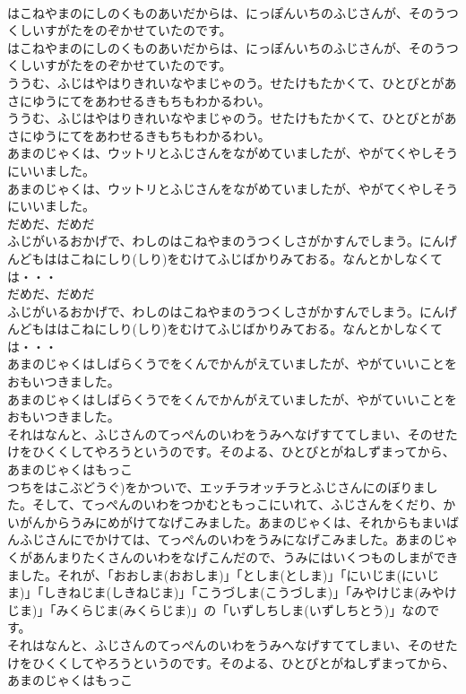 \documentclass[8pt]{extreport}
\begin{document}
\begin{CJK}{UTF8}{min}
\\	はこねやまのにしのくものあいだからは、にっぽんいちのふじさんが、そのうつくしいすがたをのぞかせていたのです。
\\	はこねやまのにしのくものあいだからは、にっぽんいちのふじさんが、そのうつくしいすがたをのぞかせていたのです。
\\	ううむ、ふじはやはりきれいなやまじゃのう。せたけもたかくて、ひとびとがあさにゆうにてをあわせるきもちもわかるわい。　
\\	ううむ、ふじはやはりきれいなやまじゃのう。せたけもたかくて、ひとびとがあさにゆうにてをあわせるきもちもわかるわい。　
\\	あまのじゃくは、ウットリとふじさんをながめていましたが、やがてくやしそうにいいました。
\\	あまのじゃくは、ウットリとふじさんをながめていましたが、やがてくやしそうにいいました。
\\	だめだ、だめだ
\\	ふじがいるおかげで、わしのはこねやまのうつくしさがかすんでしまう。にんげんどもははこねにしり(しり)をむけてふじばかりみておる。なんとかしなくては・・・
\\	だめだ、だめだ
\\	ふじがいるおかげで、わしのはこねやまのうつくしさがかすんでしまう。にんげんどもははこねにしり(しり)をむけてふじばかりみておる。なんとかしなくては・・・
\\	あまのじゃくはしばらくうでをくんでかんがえていましたが、やがていいことをおもいつきました。
\\	あまのじゃくはしばらくうでをくんでかんがえていましたが、やがていいことをおもいつきました。
\\	それはなんと、ふじさんのてっぺんのいわをうみへなげすててしまい、そのせたけをひくくしてやろうというのです。そのよる、ひとびとがねしずまってから、あまのじゃくはもっこ
\\	つちをはこぶどうぐ)をかついで、エッチラオッチラとふじさんにのぼりました。そして、てっぺんのいわをつかむともっこにいれて、ふじさんをくだり、かいがんからうみにめがけてなげこみました。あまのじゃくは、それからもまいばんふじさんにでかけては、てっぺんのいわをうみになげこみました。あまのじゃくがあんまりたくさんのいわをなげこんだので、うみにはいくつものしまができました。それが、「おおしま(おおしま)」「としま(としま)」「にいじま(にいじま)」「しきねじま(しきねじま)」「こうづしま(こうづしま)」「みやけじま(みやけじま)」「みくらじま(みくらじま)」の「いずしちしま(いずしちとう)」なのです。
\\	それはなんと、ふじさんのてっぺんのいわをうみへなげすててしまい、そのせたけをひくくしてやろうというのです。そのよる、ひとびとがねしずまってから、あまのじゃくはもっこ

\end{CJK}
\end{document}
